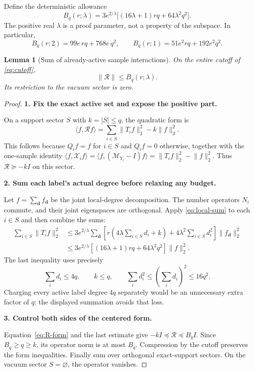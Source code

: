 \documentclass[11pt]{article}
\numberwithin{equation}{section}
\newtheorem{lemma}[theorem]{Lemma}
\theoremstyle{definition}\newtheorem{definition}[theorem]{Definition}
\theoremstyle{remark}\newtheorem{remark}[theorem]{Remark}
\newcommand{\norm}[1]{\lVert#1\rVert}\newcommand{\ip}[2]{\langle#1,#2\rangle}
\newcommand{\step}[1]{\par\addvspace{.65\baselineskip}\Needspace{4\baselineskip}\noindent\textbf{#1}\par\nobreak\smallskip}
\begin{document}
Define the deterministic allowance
\begin{equation}\label{eq:Bq}
 \boxed{B_q(r;\lambda)=3e^{2/\lambda}
 \bigl[(16\lambda+1)rq+64\lambda^2q^2\bigr].}
\end{equation}
The positive real $\lambda$ is a proof parameter, not a property of the subspace.
In particular,
\begin{equation}\label{eq:B-special}
 B_q(r;2)=99e\,rq+768e\,q^2,\qquad
 B_q(r;1)=51e^2rq+192e^2q^2.
\end{equation}

\begin{lemma}[Sum of already-active sample interactions]\label{lem:repeated}
On the entire cutoff of \eqref{eq:cutoff},
\begin{equation}\label{eq:repeated}
 \norm{\mathcal R}\le B_q(r;\lambda).
\end{equation}
Its restriction to the vacuum sector is zero.
\end{lemma}
\begin{proof}
\step{1. Fix the exact active set and expose the positive part.}
On a support sector $S$ with $k=|S|\le q$, the quadratic form is
\begin{equation}\label{eq:R-form}
 \ip f{\mathcal Rf}=\sum_{i\in S}\norm{T_if}_2^2-k\norm f_2^2.
\end{equation}
This follows because $Q_if=f$ for $i\in S$ and $Q_if=0$ otherwise, together
with the one-sample identity
$\ip f{\mathcal X_if}=\ip f{(\mathcal M_{Y_i}-I)f}=\norm{T_if}_2^2-\norm f_2^2$.
Thus $\mathcal R\succeq-kI$ on this sector.

\step{2. Sum each label's actual degree before relaxing any budget.}
Let $f=\sum_{\mathbf d}f_{\mathbf d}$ be the joint local-degree decomposition.
The number operators $N_i$ commute, and their joint eigenspaces are orthogonal.
Apply \eqref{eq:local-sum} to each $i\in S$ and then combine the sums:
\begin{align*}
 \sum_{i\in S}\norm{T_if}_2^2
 &\le3e^{2/\lambda}\sum_{\mathbf d}
 \left[r\left(4\lambda\sum_{i\in S}d_i+k\right)
       +4\lambda^2\sum_{i\in S}d_i^2\right]\norm{f_{\mathbf d}}_2^2\\
 &\le3e^{2/\lambda}
 \left[(16\lambda+1)rq+64\lambda^2q^2\right]\norm f_2^2.
\end{align*}
The last inequality uses precisely
\[
 \sum_i d_i\le4q,\qquad k\le q,\qquad
 \sum_i d_i^2\le\left(\sum_i d_i\right)^2\le16q^2.
\]
Charging every active label degree $4q$ separately would be an unnecessary extra
factor of $q$; the displayed summation avoids that loss.

\step{3. Control both sides of the centered form.}
Equation~\eqref{eq:R-form} and the last estimate give
$-kI\preceq\mathcal R\preceq B_q I$.
Since $B_q\ge q\ge k$, its operator norm is at most $B_q$.
Compression by the cutoff preserves the form inequalities. Finally sum over
orthogonal exact-support sectors. On the vacuum sector $S=\varnothing$, the
operator vanishes.
\end{proof}
\end{document}
